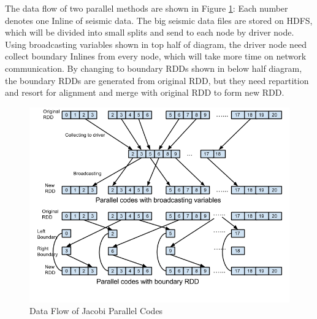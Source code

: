 The data flow of two parallel methods are shown in Figure \ref{JacobiCode}: Each number denotes one Inline of seismic data. The big seismic data files are stored on HDFS, which will be divided into small splits and send to each node by driver node. Using broadcasting variables shown in top half of diagram, the driver node need collect boundary Inlines from every node, which will take more time on network communication. By changing to boundary RDDs shown in below half diagram, the boundary RDDs are generated from original RDD, but they need repartition and resort for alignment and merge with original RDD to form new RDD.


\begin{figure}[H]
\centering
\includegraphics[scale=.6]{figures/JacobiCode.png}
\caption{Data Flow of Jacobi Parallel Codes}
\label{JacobiCode}
\end{figure}
